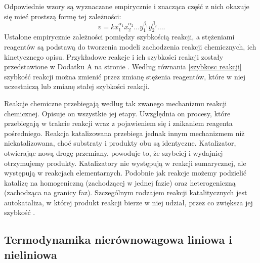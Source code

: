 \documentclass[10pt, a4paper, twoside, onecolumn]{article}
\numberwithin{equation}{section}
\begin{document}
	Odpowiednie wzory są wyznaczane empirycznie i znacząca część z nich okazuje się mieć prostszą formę tej zależności:
	\begin{equation}\label{szybkosc reakcji}
		v=k x_{1}^{\alpha_1}x_{2}^{\alpha_2}\ldots y_{1}^{\beta_1}y_{2}^{\beta_2}\ldots.
	\end{equation}
	Ustalone empirycznie zależności pomiędzy szybkością reakcji, a stężeniami reagentów są podstawą do tworzenia modeli zachodzenia reakcji chemicznych, ich kinetycznego opisu. Przykładowe reakcje i ich szybkości reakcji zostały przedstawione w Dodatku A na stronie \pageref{sec: dodatek A}. Według równania \eqref{szybkosc reakcji} szybkość reakcji można zmienić przez zmianę stężenia reagentów, które w niej uczestniczą lub zmianę stałej szybkości reakcji. \par 
	Reakcje chemiczne przebiegają według tak zwanego mechanizmu reakcji chemicznej. Opisuje on wszystkie jej etapy. Uwzględnia on procesy, które przebiegają w trakcie reakcji wraz z pojawieniem się i znikaniem reagenta pośredniego. Reakcja katalizowana przebiega jednak innym mechanizmem niż niekatalizowana, choć substraty i produkty obu są identyczne. Katalizator, otwierając nową drogę przemiany, powoduje to, że szybciej i wydajniej otrzymujemy produkty. Katalizatory nie występują w reakcji sumarycznej, ale występują w reakcjach elementarnych. Podobnie jak reakcje możemy podzielić katalizę na homogeniczną (zachodzącej w jednej fazie) oraz heterogeniczną (zachodząca na granicy faz). Szczególnym rodzajem reakcji katalitycznych jest autokataliza, w której produkt reakcji bierze w niej udział, przez co zwiększa jej szybkość \cite{pigon1, atkins_por}. 
	
	\subsection{Termodynamika nierównowagowa liniowa i nieliniowa}
	
\end{document}
